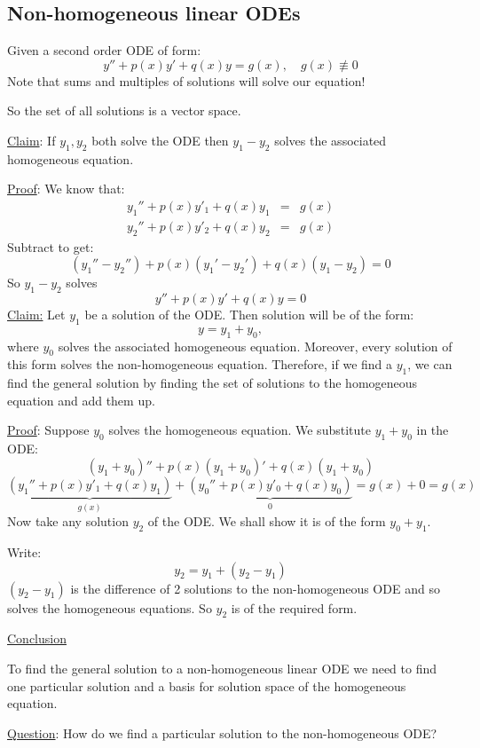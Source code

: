 \documentclass{article}
\newcommand{\nequiv}{\mathrel{\not\equiv}}
\newcommand{\tmtextbf}[1]{\text{{\bfseries{#1}}}}
\newcommand{\tmtextit}[1]{\text{{\itshape{#1}}}}
\begin{document}
\subsection{Non-homogeneous linear ODEs}

Given a second order ODE of form:
\[ y'' + p (x) y' + q (x) y = g (x), \quad g (x) \nequiv 0 \]
Note that sums and multiples of solutions will \tmtextbf{not} solve our
equation!

So the set of all solutions is \tmtextbf{not} a vector space.

{\underline{Claim}}: If $y_1, y_2$ both solve the ODE then $y_1 - y_2$ solves
the associated homogeneous equation.

{\underline{Proof}}: We know that:
\begin{eqnarray*}
  y_1'' + p (x) y'_1 + q (x) y_1 & = & g (x)\\
  y_2'' + p (x) y'_2 + q (x) y_2 & = & g (x)
\end{eqnarray*}
Subtract to get:
\[ (y_1'' - y_2'') + p (x)  (y_1' - y_2') + q (x)  (y_1 - y_2) = 0 \]
So $y_1 - y_2$ solves
\[ y'' + p (x) y' + q (x) y = 0 \]
{\underline{Claim:}} Let $y_1$ be a solution of the ODE. Then \tmtextit{every}
solution will be of the form:
\[ y = y_1 + y_0, \]
where $y_0$ solves the associated homogeneous equation. Moreover, every
solution of this form solves the non-homogeneous equation. Therefore, if we
find a $y_1$, we can find the general solution by finding the set of solutions
to the homogeneous equation and add them up.

{\underline{Proof}}: Suppose $y_0$ solves the homogeneous equation. We
substitute $y_1 + y_0$ in the ODE:
\[ (y_1 + y_0)'' + p (x)  (y_1 + y_0)' + q (x)  (y_1 + y_0) \]
\[ \underbrace{(y_1'' + p (x) y'_1 + q (x) y_1)}_{g (x)} + \underbrace{(y_0''
   + p (x) y'_0 + q (x) y_0)}_0 = g (x) + 0 = g (x) \]
Now take any solution $y_2$ of the ODE. We shall show it is of the form $y_0 +
y_1$.

Write:
\[ y_2 = y_1 + (y_2 - y_1) \]
$(y_2 - y_1)$ is the difference of 2 solutions to the non-homogeneous ODE and
so solves the homogeneous equations. So $y_2$ is of the required form.

{\underline{Conclusion}}

To find the general solution to a non-homogeneous linear ODE we need to find
one particular solution and a basis for solution space of the homogeneous
equation.

{\underline{Question}}: How do we find a particular solution to the
non-homogeneous ODE?
\end{document}
